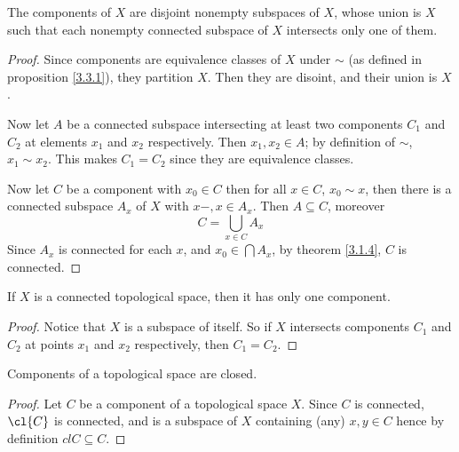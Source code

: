 \begin{theorem}\label{3.3.2}
    The components of $X$ are disjoint nonempty subspaces of  $X$, whose union is  $X$ such that
    each nonempty connected subspace of  $X$ intersects only one of them.
\end{theorem}
\begin{proof}
    Since components are equivalence classes of $X$ under $\sim$ (as defined in proposition
    \ref{3.3.1}), they partition $X$. Then they are disoint, and their union is $X$.

    Now let  $A$ be a connected subspace intersecting at least two components  $C_1$ and $C_2$ at
    elements $x_1$ and $ x_2$ respectively. Then $x_1,x_2 \in A$; by definition of $\sim$,  $x_1
    \sim x_2$. This makes $C_1=C_2$ since they are equivalence classes.

    Now let $C$ be a component with  $ x_0 \in C$ then for all $x \in C$, $ x_0 \sim x$, then there
    is a connected subspace $A_x$ of $X$ with  $x-,x \in A_x$. Then $A \subseteq C$, moreover 
        \begin{equation*}
            C=\bigcup_{x \in C}{A_x}
        \end{equation*}
    Since $A_x$ is connected for each  $x$, and  $ x_0 \in \bigcap{A_x}$, by theorem \ref{3.1.4},
    $C$ is connected.
\end{proof}
\begin{corollary}
    If $X$ is a connected topological space, then it has only one component.
\end{corollary}
\begin{proof}
    Notice that $X$ is a subspace of itself. So if $X$ intersects components  $C_1$ and $C_2$ at
    points  $x_1$ and  $x_2$ respectively, then $C_1=C_2$.
\end{proof}

\begin{lemma}\label{3.3.3}
    Components of a topological space are closed.
\end{lemma}
\begin{proof}
    Let $C$ be a component of a topological space  $X$. Since  $C$ is connected,  $\cl{C}$ is
    connected, and is a subspace of $X$ containing (any) $x,y \in C$ hence by definition $cl{C}
    \subseteq C$.
\end{proof}


